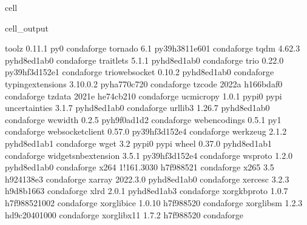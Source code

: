 \documentclass[letterpaper,table,10pt,english]{jupyterBook}
\begin{document}
\begin{sphinxuseclass}{cell}
\begin{sphinxVerbatimOutput}
\begin{sphinxuseclass}{cell_output}
\begin{sphinxVerbatim}[commandchars=\\\{\}]
toolz                     0.11.1                     py\PYGZus{}0    conda\PYGZhy{}forge
tornado                   6.1              py39h3811e60\PYGZus{}1    conda\PYGZhy{}forge
tqdm                      4.62.3             pyhd8ed1ab\PYGZus{}0    conda\PYGZhy{}forge
traitlets                 5.1.1              pyhd8ed1ab\PYGZus{}0    conda\PYGZhy{}forge
trio                      0.22.0           py39hf3d152e\PYGZus{}1    conda\PYGZhy{}forge
trio\PYGZhy{}websocket            0.10.2             pyhd8ed1ab\PYGZus{}0    conda\PYGZhy{}forge
typing\PYGZus{}extensions         3.10.0.2           pyha770c72\PYGZus{}0    conda\PYGZhy{}forge
tzcode                    2022a                h166bdaf\PYGZus{}0    conda\PYGZhy{}forge
tzdata                    2021e                he74cb21\PYGZus{}0    conda\PYGZhy{}forge
uc\PYGZhy{}micro\PYGZhy{}py               1.0.1                    pypi\PYGZus{}0    pypi
uncertainties             3.1.7              pyhd8ed1ab\PYGZus{}0    conda\PYGZhy{}forge
urllib3                   1.26.7             pyhd8ed1ab\PYGZus{}0    conda\PYGZhy{}forge
wcwidth                   0.2.5              pyh9f0ad1d\PYGZus{}2    conda\PYGZhy{}forge
webencodings              0.5.1                      py\PYGZus{}1    conda\PYGZhy{}forge
websocket\PYGZhy{}client          0.57.0           py39hf3d152e\PYGZus{}4    conda\PYGZhy{}forge
werkzeug                  2.1.2              pyhd8ed1ab\PYGZus{}1    conda\PYGZhy{}forge
wget                      3.2                      pypi\PYGZus{}0    pypi
wheel                     0.37.0             pyhd8ed1ab\PYGZus{}1    conda\PYGZhy{}forge
widgetsnbextension        3.5.1            py39hf3d152e\PYGZus{}4    conda\PYGZhy{}forge
wsproto                   1.2.0              pyhd8ed1ab\PYGZus{}0    conda\PYGZhy{}forge
x264                      1!161.3030           h7f98852\PYGZus{}1    conda\PYGZhy{}forge
x265                      3.5                  h924138e\PYGZus{}3    conda\PYGZhy{}forge
xarray                    2022.3.0           pyhd8ed1ab\PYGZus{}0    conda\PYGZhy{}forge
xerces\PYGZhy{}c                  3.2.3                h9d8b166\PYGZus{}3    conda\PYGZhy{}forge
xlrd                      2.0.1              pyhd8ed1ab\PYGZus{}3    conda\PYGZhy{}forge
xorg\PYGZhy{}kbproto              1.0.7             h7f98852\PYGZus{}1002    conda\PYGZhy{}forge
xorg\PYGZhy{}libice               1.0.10               h7f98852\PYGZus{}0    conda\PYGZhy{}forge
xorg\PYGZhy{}libsm                1.2.3             hd9c2040\PYGZus{}1000    conda\PYGZhy{}forge
xorg\PYGZhy{}libx11               1.7.2                h7f98852\PYGZus{}0    conda\PYGZhy{}forge

\end{sphinxVerbatim}
\end{sphinxuseclass}
\end{sphinxVerbatimOutput}
\end{sphinxuseclass}
\end{document}
